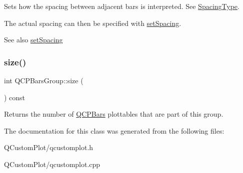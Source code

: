 Sets how the spacing between adjacent bars is interpreted. See \mbox{\hyperlink{class_q_c_p_bars_group_a4c0521120a97e60bbca37677a37075b6}{Spacing\+Type}}.

The actual spacing can then be specified with \mbox{\hyperlink{class_q_c_p_bars_group_aa553d327479d72a0c3dafcc724a190e2}{set\+Spacing}}.

\begin{DoxySeeAlso}{See also}
\mbox{\hyperlink{class_q_c_p_bars_group_aa553d327479d72a0c3dafcc724a190e2}{set\+Spacing}} 
\end{DoxySeeAlso}
\mbox{\label{class_q_c_p_bars_group_a3780ec77919cb00840207ec7a0f00dd5}} 
\subsubsection{\texorpdfstring{size()}{size()}}
{\footnotesize\ttfamily int Q\+C\+P\+Bars\+Group\+::size (\begin{DoxyParamCaption}{ }\end{DoxyParamCaption}) const\hspace{0.3cm}{\ttfamily [inline]}}

Returns the number of \mbox{\hyperlink{class_q_c_p_bars}{Q\+C\+P\+Bars}} plottables that are part of this group. 

The documentation for this class was generated from the following files\+:\begin{DoxyCompactItemize}
\item 
Q\+Custom\+Plot/qcustomplot.\+h\item 
Q\+Custom\+Plot/qcustomplot.\+cpp\end{DoxyCompactItemize}
